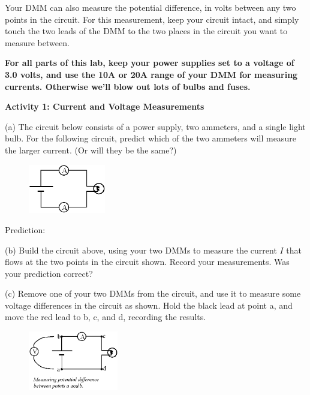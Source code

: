 Your DMM can also measure the potential difference, in volts between any two points in the circuit.  For this measurement, keep your circuit intact, and simply touch the two leads of the DMM to the two places in the circuit you want to measure between.

\begin{newboxed}
\textbf{For all parts of this lab, keep your power supplies set to a voltage of 3.0 volts, and use the 10A or 20A range of your DMM for measuring currents.  Otherwise we'll blow out lots of bulbs and fuses.}
\end{newboxed}

\vspace{0.1 in}
\textbf{Activity 1: Current and Voltage Measurements}

(a) The circuit below consists of a power supply, two ammeters, and a single light bulb.  For the following circuit, predict which of the two ammeters will measure the larger current.  (Or will they be the same?)

\begin{figure}
    \vspace{-0.4 in}
    \includegraphics[width=0.3\textwidth]{electric_circuits/circ_diag1.eps}
\end{figure}

\vspace{0.2 in}
Prediction:
\vspace{1.2 in}

\pagebreak
(b) Build the circuit above, using your two DMMs to measure the current $I$ that flows at the two points in the circuit shown.  Record your measurements.  Was your prediction correct?
\vspace{1 in}

(c) Remove one of your two DMMs from the circuit, and use it to measure some voltage differences in the circuit as shown.  Hold the black lead at point a, and move the red lead to b, c, and d, recording the results.

\begin{figure}
    \vspace{-0.5 in}
    \includegraphics[width=0.35\textwidth]{electric_circuits/circ_diag2.eps}
\end{figure}

